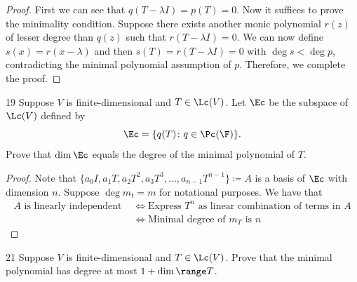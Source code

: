 \documentclass{extarticle}
\begin{document}
\begin{proof}
First we can see that \(q(T - \lambda I) = p(T) = 0\). Now it suffices to prove the minimality condition. 
Suppose there exists another monic polynomial \(r(z)\) of lesser degree than \(q(z)\) such that 
\(r(T - \lambda I) = 0\). We can now define \(s(x) = r(x - \lambda)\) and then 
\(s(T) = r(T - \lambda I) = 0\) with \(\deg s < \deg p\), contradicting the minimal polynomial assumption 
of \(p\). Therefore, we complete the proof. 
\end{proof}

\begin{problem}{19}
    Suppose \(V\) is finite-dimensional and \(T \in \Lc(V)\). Let \(\Ec\) be the subspace of 
    \(\Lc(V)\) defined by 
    \[\Ec = \{q(T) \colon q \in \Pc(\F)\}.\]
    Prove that \(\dim \Ec\) equals the degree of the minimal polynomial of \(T\).
\end{problem}

\begin{proof}
Note that \(\{a_0 I, a_1 T, a_2 T^2, a_3 T^3, \ldots, a_{n-1} T^{n-1}\} \coloneqq A\) is a basis of \(\Ec\) with dimension \(n\). 
Suppose \(\deg m_t = m\) for notational purposes. We have that 
\begin{align*}
    A \text{ is linearly independent } &\Longleftrightarrow \text{Express } T^n \text{ as linear combination of terms in } A \\ 
    &\Longleftrightarrow \text{Minimal degree of } m_T \text{ is } n 
\end{align*}

\end{proof}

\begin{problem}{21}
    Suppose \(V\) is finite-dimensional and \(T \in \Lc(V)\). Prove that the minimal polynomial has 
    degree at most \(1 + \dim \range T\).
\end{problem}
\end{document}
